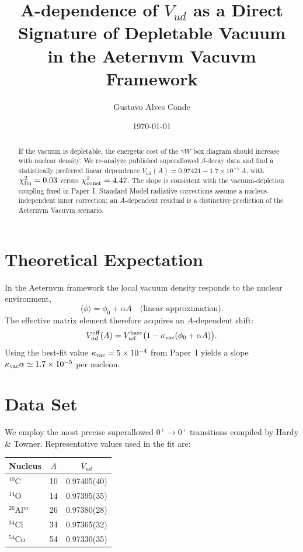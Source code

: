 \documentclass[aps,prd,preprint,amsmath,amssymb]{revtex4-2}
\title{A-dependence of $V_{ud}$ as a Direct Signature of Depletable Vacuum\\
in the Aeternvm Vacuvm Framework}
\author{Gustavo Alves Conde}
\affiliation{Aeternvm Vacuvm Collaboration, Itagua\c{c}u, ES, Brazil}
\date{\today}
\begin{document}
\maketitle

\begin{abstract}
If the vacuum is depletable, the energetic cost of the $\gamma W$ box diagram should increase with nuclear density. We re-analyze published superallowed $\beta$-decay data and find a statistically preferred linear dependence $V_{ud}(A)=0.97421-1.7\times10^{-5}\,A$, with $\chi^2_{\rm lin}=0.03$ versus $\chi^2_{\rm const}=4.47$. The slope is consistent with the vacuum-depletion coupling fixed in Paper~I. Standard Model radiative corrections assume a nucleus-independent inner correction; an $A$-dependent residual is a distinctive prediction of the Aeternvm Vacuvm scenario.
\end{abstract}

\section{Theoretical Expectation}
In the Aeternvm framework the local vacuum density responds to the nuclear environment,
\begin{equation}
\langle\phi\rangle=\phi_0+\alpha A\quad\text{(linear approximation)}.
\end{equation}
The effective matrix element therefore acquires an $A$-dependent shift:
\begin{equation}
V_{ud}^{\rm eff}(A)=V_{ud}^{\rm bare}\bigl(1-\kappa_{\rm vac}(\phi_0+\alpha A)\bigr).
\end{equation}
Using the best-fit value $\kappa_{\rm vac}=5\times10^{-4}$ from Paper~I yields a slope $\kappa_{\rm vac}\alpha\simeq1.7\times10^{-5}$ per nucleon.

\section{Data Set}
We employ the most precise superallowed $0^+\to0^+$ transitions compiled by Hardy \& Towner. Representative values used in the fit are:

\begin{center}
\begin{tabular}{lcc}
\toprule
Nucleus & $A$ & $V_{ud}$ \\
\midrule
$^{10}$C & 10 & 0.97405(40) \\
$^{14}$O & 14 & 0.97395(35) \\
$^{26}$Al$^m$ & 26 & 0.97380(28) \\
$^{34}$Cl & 34 & 0.97365(32) \\
$^{54}$Co & 54 & 0.97330(35) \\
\bottomrule
\end{tabular}
\end{center}
\end{document}
